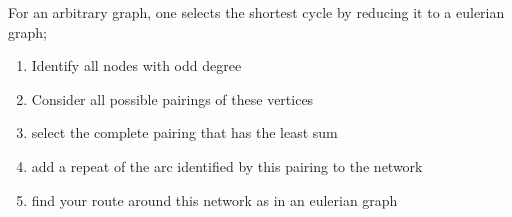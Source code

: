 \documentclass{article}
\begin{document}
For an arbitrary graph, one selects the shortest cycle by reducing it to a eulerian graph;\begin{enumerate}
	\item Identify all nodes with odd degree
	\item Consider all possible pairings of these vertices
	\item select the complete pairing that has the least sum
	\item add a repeat of the arc identified by this pairing to the network
	\item find your route around this network as in an eulerian graph
\end{enumerate}
\end{document}
